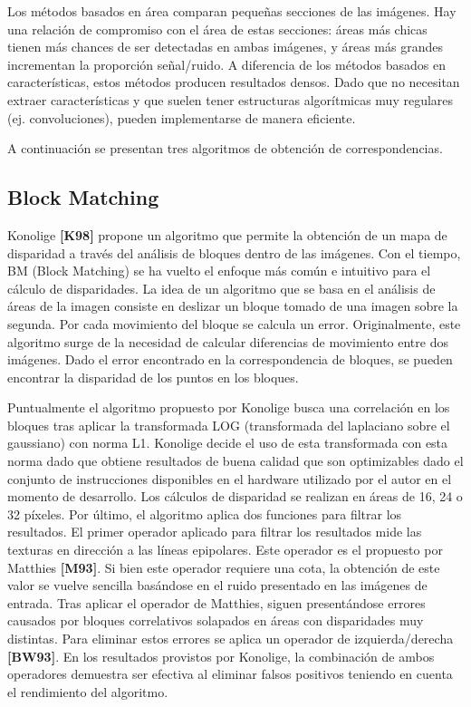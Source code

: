 \documentclass[11pt,a4paper,titlepage]{article}
\newcommand{\Cite}[1]{\textbf{[#1]}}
\begin{document}
Los métodos basados en área comparan pequeñas secciones de las imágenes. Hay una relación de compromiso con el área de estas secciones: áreas más chicas tienen más chances de ser detectadas en ambas imágenes, y áreas más grandes incrementan la proporción señal/ruido. A diferencia de los métodos basados en características, estos métodos producen resultados densos. Dado que no necesitan extraer características y que suelen tener estructuras algorítmicas muy regulares (ej. convoluciones), pueden implementarse de manera eficiente.

A continuación se presentan tres algoritmos de obtención de correspondencias.

\subsection{Block Matching}

Konolige \Cite{K98} propone un algoritmo que permite la obtención de un mapa de disparidad a través del análisis de bloques dentro de las imágenes. Con el tiempo, BM (Block Matching) se ha vuelto el enfoque más común e intuitivo para el cálculo de disparidades. La idea de un algoritmo que se basa en el análisis de áreas de la imagen consiste en deslizar un bloque tomado de una imagen sobre la segunda. Por cada movimiento del bloque se calcula un error. Originalmente, este algoritmo surge de la necesidad de calcular diferencias de movimiento entre dos imágenes. Dado el error encontrado en la correspondencia de bloques, se pueden encontrar la disparidad de los puntos en los bloques.

Puntualmente el algoritmo propuesto por Konolige busca una correlación en los bloques tras aplicar la transformada LOG (transformada del laplaciano sobre el gaussiano) con norma L1. Konolige decide el uso de esta transformada con esta norma dado que obtiene resultados de buena calidad que son optimizables dado el conjunto de instrucciones disponibles en el hardware utilizado por el autor en el momento de desarrollo. Los cálculos de disparidad se realizan en áreas de 16, 24 o 32 píxeles. Por último, el algoritmo aplica dos funciones para filtrar los resultados. El primer operador aplicado para filtrar los resultados mide las texturas en dirección a las líneas epipolares. Este operador es el propuesto por Matthies \Cite{M93}. Si bien este operador requiere una cota, la obtención de este valor se vuelve sencilla basándose en el ruido presentado en las imágenes de entrada. Tras aplicar el operador de Matthies, siguen presentándose errores causados por bloques correlativos solapados en áreas con disparidades muy distintas. Para eliminar estos errores se aplica un operador de izquierda/derecha \Cite{BW93}. En los resultados provistos por Konolige, la combinación de ambos operadores demuestra ser efectiva al eliminar falsos positivos teniendo en cuenta el rendimiento del algoritmo.
\end{document}
